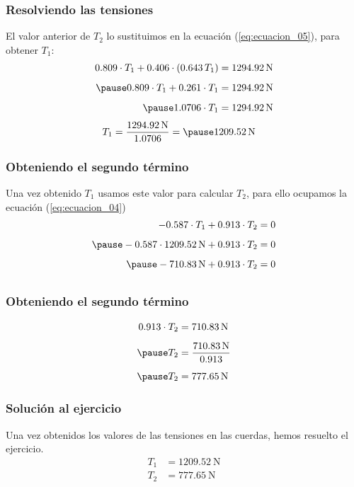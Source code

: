 \documentclass[12pt]{beamer}
\begin{document}
\begin{frame}
\frametitle{Resolviendo las tensiones}
El valor anterior de $T_{2}$ lo sustituimos en la ecuación (\ref{eq:ecuacion_05}), para obtener $T_{1}$:
\pause
\begin{eqnarray*}
\begin{aligned}
0.809 \cdot T_{1} + 0.406 \cdot (0.643 \, T_{1}) &= \SI{1294.92}{\newton} \\[0.5em] \pause
0.809 \cdot T_{1} + 0.261 \cdot T_{1} &= \SI{1294.92}{\newton} \\[0.5em] \pause
1.0706 \cdot T_{1} &= \SI{1294.92}{\newton}
\end{aligned}
\end{eqnarray*}
\begin{eqnarray*}
T_{1} &= \dfrac{\SI{1294.92}{\newton}}{1.0706} = \pause \SI{1209.52}{\newton}
\end{eqnarray*}
\end{frame}
\begin{frame}
\frametitle{Obteniendo el segundo término}
Una vez obtenido $T_{1}$ usamos este valor para calcular $T_{2}$, para ello ocupamos la ecuación (\ref{eq:ecuacion_04})
\pause
\begin{eqnarray*}
\begin{aligned}
-0.587 \cdot T_{1} + 0.913 \cdot T_{2} &= 0 \\[0.5em] \pause
-0.587 \cdot \SI{1209.52}{\newton} + 0.913 \cdot T_{2} &= 0 \\[0.5em] \pause
- \SI{710.83}{\newton} + 0.913 \cdot T_{2} &= 0 \\[0.5em]
\end{aligned}
\end{eqnarray*}
\end{frame}
\begin{frame}
\frametitle{Obteniendo el segundo término}
\begin{eqnarray*}
\begin{aligned}
0.913 \cdot T_{2} &= \SI{710.83}{\newton} \\[0.5em] \pause
T_{2} &= \dfrac{\SI{710.83}{\newton}}{0.913} \\[0.5em] \pause
T_{2} &= \SI{777.65}{\newton}
\end{aligned}
\end{eqnarray*}
\end{frame}
\begin{frame}
\frametitle{Solución al ejercicio}
Una vez obtenidos los valores de las tensiones en las cuerdas, hemos resuelto el ejercicio.
\begin{align*}
T_{1} &= \SI{1209.52}{\newton} \\[0.5em]
T_{2} &= \SI{777.65}{\newton}
\end{align*}
\end{frame}
\end{document}
